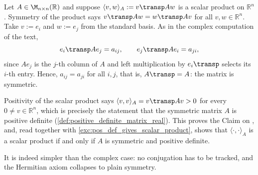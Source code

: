 \begin{exercisesolution}
\label{sol:real_case_of_claim}
  Let $A \in \M_{n \times n}(\mathbb{R})$ and suppose $\langle v, w \rangle_A := v\transp A w$ is a scalar product on $\mathbb{R}^n$. Symmetry of the product says $v\transp A w = w\transp A v$ for all $v, w \in \mathbb{R}^n$. Take $v := e_i$ and $w := e_j$ from the standard basis. As in the complex computation of the text,
  \[ e_i\transp A e_j = a_{ij}, \qquad e_j\transp A e_i = a_{ji}, \]
  since $A e_j$ is the $j$-th column of $A$ and left multiplication by $e_i\transp$ selects its $i$-th entry. Hence, $a_{ij} = a_{ji}$ for all $i, j$, that is, $A\transp = A$: the matrix is symmetric.

  Positivity of the scalar product says $\langle v, v \rangle_A = v\transp A v > 0$ for every $0 \ne v \in \mathbb{R}^n$, which is precisely the statement that the symmetric matrix $A$ is positive definite (\cref{def:positive_definite_matrix_real}). This proves the Claim on , and, read together with \cref{exc:pos_def_gives_scalar_product}, shows that $\langle \cdot, \cdot \rangle_A$ is a scalar product if and only if $A$ is symmetric and positive definite.

  It is indeed simpler than the complex case: no conjugation has to be tracked, and the Hermitian axiom collapses to plain symmetry.
\end{exercisesolution}

